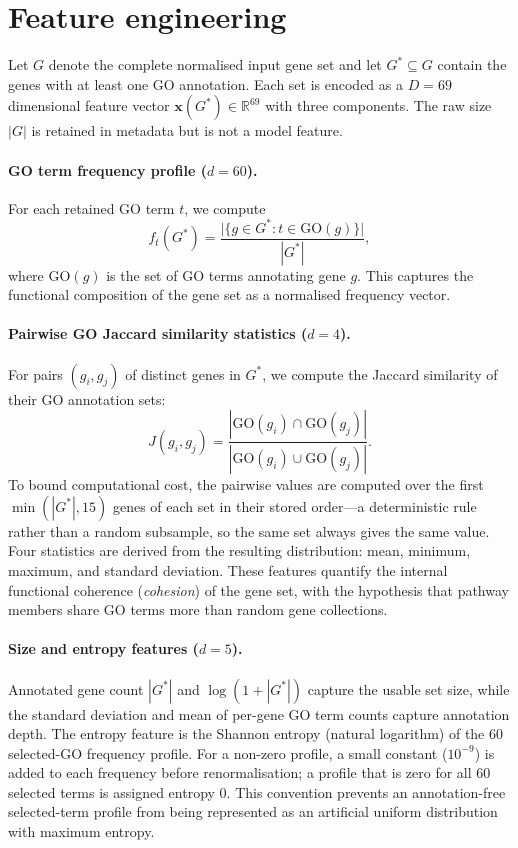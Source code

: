 \documentclass[12pt,letterpaper,oneside,openany]{book}
\begin{document}
\section{Feature engineering}
\label{sec:features}

Let $G$ denote the complete normalised input gene set and let
$G^* \subseteq G$ contain the genes with at least one GO annotation. Each set is
encoded as a $D = 69$ dimensional feature vector
$\mathbf{x}(G^*) \in \mathbb{R}^{69}$ with three components. The raw size
$|G|$ is retained in metadata but is not a model feature.

\paragraph{GO term frequency profile ($d = 60$).}
For each retained GO term $t$, we compute
\begin{equation}
f_t(G^*) = \frac{\bigl|\{g \in G^* : t \in \mathrm{GO}(g)\}\bigr|}{|G^*|},
\label{eq:go_freq}
\end{equation}
where $\mathrm{GO}(g)$ is the set of GO terms annotating gene $g$.
This captures the functional composition of the gene set as a normalised
frequency vector.

\paragraph{Pairwise GO Jaccard similarity statistics ($d = 4$).}
For pairs $(g_i, g_j)$ of distinct genes in $G^*$, we compute the
Jaccard similarity of their GO annotation sets:
\begin{equation}
J(g_i, g_j) = \frac{|\mathrm{GO}(g_i) \cap \mathrm{GO}(g_j)|}{|\mathrm{GO}(g_i) \cup \mathrm{GO}(g_j)|}.
\label{eq:jaccard}
\end{equation}
To bound computational cost, the pairwise values are computed over the first
$\min(|G^*|, 15)$ genes of each set in their stored order---a deterministic rule
rather than a random subsample, so the same set always gives the same value.
Four statistics are derived from the resulting distribution: mean, minimum,
maximum, and standard deviation.
These features quantify the internal functional coherence (\emph{cohesion})
of the gene set, with the hypothesis that pathway members share GO terms
more than random gene collections.

\paragraph{Size and entropy features ($d = 5$).}
Annotated gene count $|G^*|$ and $\log(1 + |G^*|)$ capture the usable set size, while the standard deviation and mean of per-gene GO term counts capture annotation depth. The entropy feature is the Shannon entropy (natural logarithm) of the 60 selected-GO frequency profile. For a non-zero profile, a small constant ($10^{-9}$) is added to each frequency before renormalisation; a profile that is zero for all 60 selected terms is assigned entropy 0. This convention prevents an annotation-free selected-term profile from being represented as an artificial uniform distribution with maximum entropy.
\end{document}
